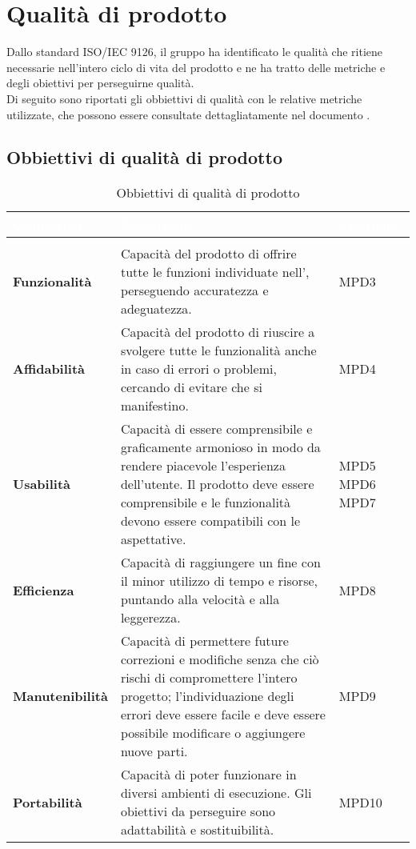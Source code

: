 \section{Qualità di prodotto}

Dallo standard ISO/IEC 9126, il gruppo \Gruppo{} ha identificato le qualità che ritiene necessarie nell'intero ciclo di vita del prodotto e ne ha tratto delle metriche e degli obiettivi per perseguirne qualità.\\
Di seguito sono riportati gli obbiettivi di qualità con le relative metriche utilizzate, che possono essere consultate dettagliatamente nel documento .


\subsection{Obbiettivi di qualità di prodotto}
\renewcommand{\arraystretch}{1.5}
\begin{longtable}{C{3cm} | C{9.5cm} | C{2.5cm}}

\textcolor{white}{\textbf{Obbiettivo}}&
\textcolor{white}{\textbf{Descrizione}}&
\textcolor{white}{\textbf{Metriche}} \\
\endfirsthead
{}\\
\endfoot
{}\caption{Obbiettivi di qualità di prodotto}
\endlastfoot
	
	\textbf{Funzionalità} & 
	Capacità del prodotto di offrire tutte le funzioni individuate nell'\AdRv{}, perseguendo accuratezza e adeguatezza. &
	MPD3 \\
	
	\textbf{Affidabilità} &
	 Capacità del prodotto di riuscire a svolgere tutte le funzionalità anche in caso di errori o problemi, cercando di evitare che si manifestino. &
	MPD4 \\
	
	\textbf{Usabilità} &
	Capacità di essere comprensibile e graficamente armonioso in modo da rendere piacevole l'esperienza dell'utente. Il prodotto deve essere comprensibile e le funzionalità devono essere compatibili con le aspettative. &
    MPD5 \newline MPD6 \newline MPD7 \\
    
	\textbf{Efficienza} & 
	Capacità di raggiungere un fine con il minor utilizzo di tempo e risorse, puntando alla velocità e alla leggerezza. &
	MPD8 \\
	
	\textbf{Manutenibilità} & 
	Capacità di permettere future correzioni e modifiche senza che ciò rischi di compromettere l'intero progetto; l'individuazione degli errori deve essere facile e deve essere possibile modificare o aggiungere nuove parti. &
 	MPD9 \\
 	
	\textbf{Portabilità} & 
	Capacità di poter funzionare in diversi ambienti di esecuzione. Gli obiettivi da perseguire sono adattabilità e sostituibilità. &
	MPD10 \\
	
\end{longtable}	

